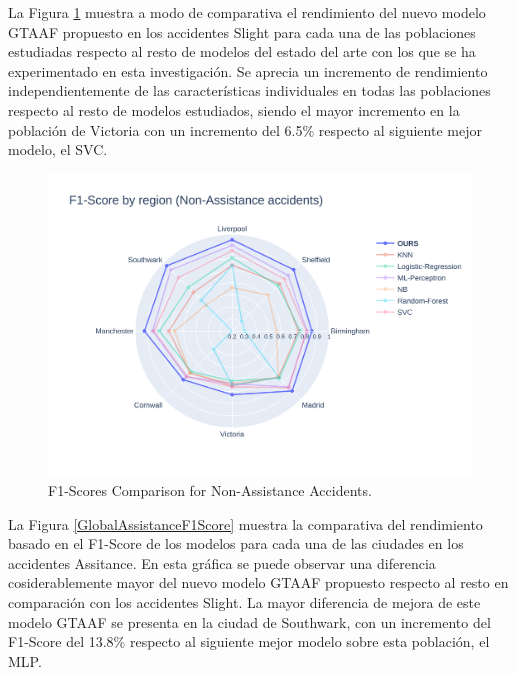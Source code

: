 \documentclass{uathesis-es}
\begin{document}
La Figura \ref{GlobalSlightF1Score} muestra a modo de comparativa el rendimiento del nuevo modelo GTAAF propuesto en los accidentes Slight para cada una de las poblaciones estudiadas respecto al resto de modelos del estado del arte con los que se ha experimentado en esta investigación. Se aprecia un incremento de rendimiento independientemente de las características individuales en todas las poblaciones respecto al resto de modelos estudiados, siendo el mayor incremento en la población de Victoria con un incremento del 6.5\% respecto al siguiente mejor modelo, el SVC.

\begin{figure}[H]
    \centering
    \includegraphics[width=150mm]{Figures/Slight.png}
    \caption{F1-Scores Comparison for Non-Assistance Accidents.}
    \label{GlobalSlightF1Score}
\end{figure}

La Figura \ref{GlobalAssistanceF1Score} muestra la comparativa del rendimiento basado en el F1-Score de los modelos para cada una de las ciudades en los accidentes Assitance. En esta gráfica se puede observar una diferencia cosiderablemente mayor del nuevo modelo GTAAF propuesto respecto al resto en comparación con los accidentes Slight. La mayor diferencia de mejora de este modelo GTAAF se presenta en la ciudad de Southwark, con un incremento del F1-Score del 13.8\% respecto al siguiente mejor modelo sobre esta población, el MLP.
\end{document}
